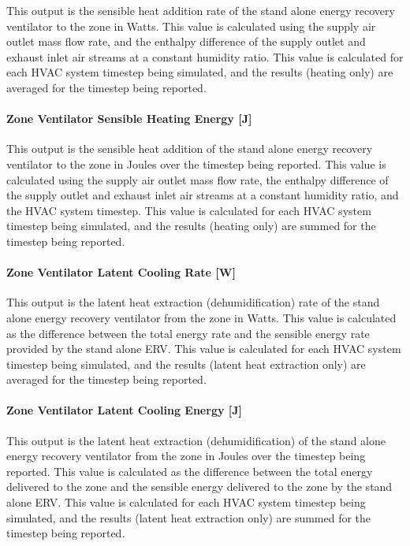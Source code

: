 This output is the sensible heat addition rate of the stand alone energy recovery ventilator to the zone in Watts. This value is calculated using the supply air outlet mass flow rate, and the enthalpy difference of the supply outlet and exhaust inlet air streams at a constant humidity ratio. This value is calculated for each HVAC system timestep being simulated, and the results (heating only) are averaged for the timestep being reported.

\paragraph{Zone Ventilator Sensible Heating Energy {[}J{]}}\label{zone-ventilator-sensible-heating-energy-j}

This output is the sensible heat addition of the stand alone energy recovery ventilator to the zone in Joules over the timestep being reported. This value is calculated using the supply air outlet mass flow rate, the enthalpy difference of the supply outlet and exhaust inlet air streams at a constant humidity ratio, and the HVAC system timestep. This value is calculated for each HVAC system timestep being simulated, and the results (heating only) are summed for the timestep being reported.

\paragraph{Zone Ventilator Latent Cooling Rate {[}W{]}}\label{zone-ventilator-latent-cooling-rate-w}

This output is the latent heat extraction (dehumidification) rate of the stand alone energy recovery ventilator from the zone in Watts. This value is calculated as the difference between the total energy rate and the sensible energy rate provided by the stand alone ERV. This value is calculated for each HVAC system timestep being simulated, and the results (latent heat extraction only) are averaged for the timestep being reported.

\paragraph{Zone Ventilator Latent Cooling Energy {[}J{]}}\label{zone-ventilator-latent-cooling-energy-j}

This output is the latent heat extraction (dehumidification) of the stand alone energy recovery ventilator from the zone in Joules over the timestep being reported. This value is calculated as the difference between the total energy delivered to the zone and the sensible energy delivered to the zone by the stand alone ERV. This value is calculated for each HVAC system timestep being simulated, and the results (latent heat extraction only) are summed for the timestep being reported.

